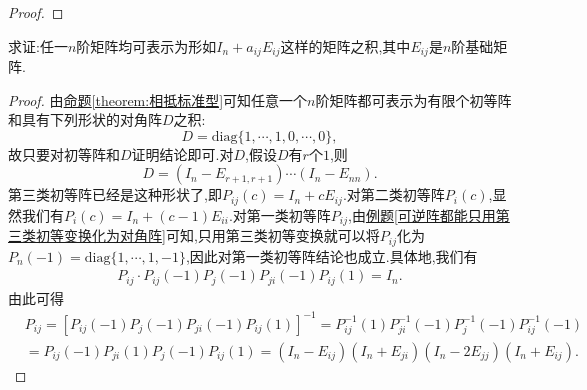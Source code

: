 \documentclass[../../main.tex]{subfiles}%
\begin{document}
\begin{proof}
\end{proof}

\begin{example}
求证:任一\(n\)阶矩阵均可表示为形如\(I_n + a_{ij}E_{ij}\)这样的矩阵之积,其中\(E_{ij}\)是\(n\)阶基础矩阵.
\end{example}
\begin{proof}

由\hyperref[theorem:相抵标准型]{命题\ref{theorem:相抵标准型}}可知任意一个\(n\)阶矩阵都可表示为有限个初等阵和具有下列形状的对角阵\(D\)之积:
\[
D = \mathrm{diag}\{1,\cdots,1,0,\cdots,0\},
\]
故只要对初等阵和\(D\)证明结论即可.对\(D\),假设\(D\)有\(r\)个\(1\),则
\[
D = (I_n - E_{r + 1,r + 1})\cdots(I_n - E_{nn}).
\]
第三类初等阵已经是这种形状了,即$P_{ij}\left( c \right) =I_n+cE_{ij}$.对第二类初等阵\(P_i(c)\),显然我们有\(P_i(c) = I_n + (c - 1)E_{ii}\).对第一类初等阵\(P_{ij}\),由\hyperref[可逆阵都能只用第三类初等变换化为对角阵]{例题\ref{可逆阵都能只用第三类初等变换化为对角阵}}可知,只用第三类初等变换就可以将\(P_{ij}\)化为\(P_n(-1) = \mathrm{diag}\{1,\cdots,1,-1\}\),因此对第一类初等阵结论也成立.具体地,我们有
\begin{align*}
P_{ij}\cdot P_{ij}\left( -1 \right) P_j\left( -1 \right) P_{ji}\left( -1 \right) P_{ij}\left( 1 \right) =I_n. 
\end{align*}
由此可得
\begin{align*}
&P_{ij}=\left[ P_{ij}\left( -1 \right) P_j\left( -1 \right) P_{ji}\left( -1 \right) P_{ij}\left( 1 \right) \right] ^{-1}=P_{ij}^{-1}\left( 1 \right) P_{ji}^{-1}\left( -1 \right) P_{j}^{-1}\left( -1 \right) P_{ij}^{-1}\left( -1 \right) 
\\
&=P_{ij}\left( -1 \right) P_{ji}\left( 1 \right) P_j\left( -1 \right) P_{ij}\left( 1 \right) =\left( I_n-E_{ij} \right) \left( I_n+E_{ji} \right) \left( I_n-2E_{jj} \right) \left( I_n+E_{ij} \right) .
\end{align*}

\end{proof}
\end{document}

